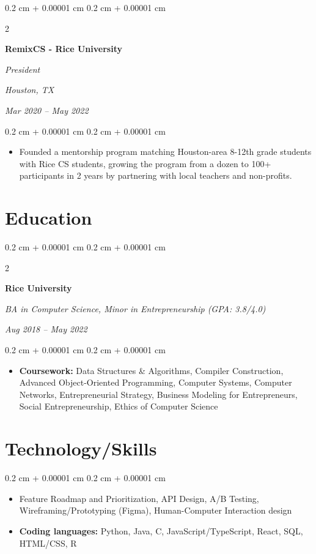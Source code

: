 \documentclass[10pt, letterpaper]{article}
\newenvironment{highlights}{
    \begin{itemize}[
        topsep=0.10 cm,
        parsep=0.10 cm,
        partopsep=0pt,
        itemsep=0pt,
        leftmargin=0.4 cm + 10pt
    ]
}{
    \end{itemize}
} %
\newenvironment{onecolentry}{
    \begin{adjustwidth}{
        0.2 cm + 0.00001 cm
    }{
        0.2 cm + 0.00001 cm
    }
}{
    \end{adjustwidth}
} %
\newenvironment{twocolentry}[2][]{
    \onecolentry
    \def\secondColumn{#2}
    \setcolumnwidth{\fill, 4.5 cm}
    \begin{paracol}{2}
}{
    \switchcolumn \raggedleft \secondColumn
    \end{paracol}
    \endonecolentry
} %
\begin{document}
        \vspace{0.2 cm}

        \begin{twocolentry}{
        \textit{Houston, TX}    
            
        \textit{Mar 2020 – May 2022}}
            \textbf{RemixCS - Rice University}
            
            \textit{President}
        \end{twocolentry}

        \vspace{0.10 cm}
        \begin{onecolentry}
            \begin{highlights}
                \item Founded a mentorship program matching Houston-area 8-12th grade students with Rice CS students, growing the program from a dozen to 100+ participants in 2 years by partnering with local teachers and non-profits.
            \end{highlights}
        \end{onecolentry}
   
   \section{Education}

        \begin{twocolentry}{            
        \textit{Aug 2018 – May 2022}}
            \textbf{Rice University}
            
            \textit{BA in Computer Science, Minor in Entrepreneurship (GPA: 3.8/4.0)}
        \end{twocolentry}

        \vspace{0.10 cm}
        \begin{onecolentry}
            \begin{highlights}
                \item \textbf{Coursework:} Data Structures \& Algorithms, Compiler Construction, Advanced Object-Oriented Programming, Computer Systems, Computer Networks, Entrepreneurial Strategy, Business Modeling for Entrepreneurs, Social Entrepreneurship, Ethics of Computer Science
            \end{highlights}
        \end{onecolentry}
    \section{Technology/Skills}
        \begin{onecolentry}
            \begin{highlights}
                \item Feature Roadmap and Prioritization, API Design, A/B Testing, Wireframing/Prototyping (Figma), Human-Computer Interaction design
                \item \textbf{Coding languages:} Python, Java, C, JavaScript/TypeScript, React, SQL, HTML/CSS, R
             \end{highlights}
        \end{onecolentry}
\end{document}
